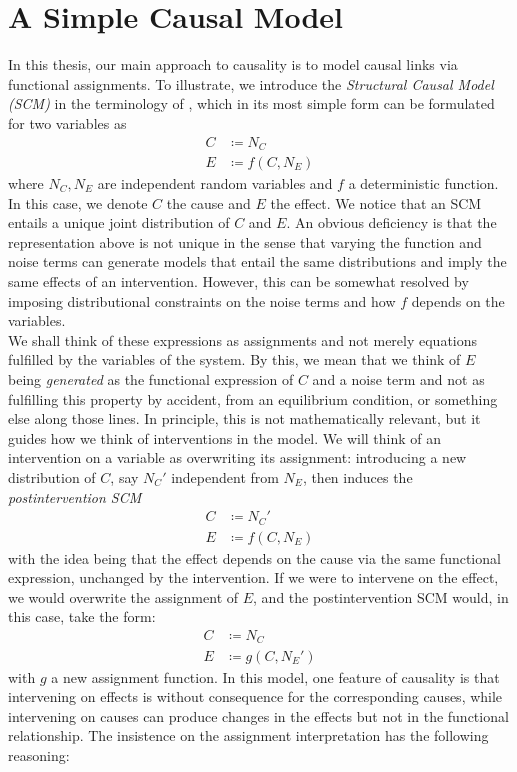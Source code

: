\documentclass[11pt, a4paper]{memoir}
\theoremstyle{break}
\theoremstyle{break}
\theoremstyle{nonumberplain}
\begin{document}
\section{A Simple Causal Model}
In this thesis, our main approach to causality is to model causal links via functional assignments. To illustrate, we introduce the \textit{Structural Causal Model (SCM)} in the terminology of \cite{Peters}, which in its most simple form can be formulated for two variables as
\begin{align*}
C&\coloneqq N_C\\
E&\coloneqq f(C,N_E)
\end{align*}
where $N_C,N_E$ are independent random variables and $f$ a deterministic function. In this case, we denote $C$ the cause and $E$ the effect. We notice that an SCM entails a unique joint distribution of $C$ and $E$. An obvious deficiency is that the representation above is not unique in the sense that varying the function and noise terms can generate models that entail the same distributions and imply the same effects of an intervention. However, this can be somewhat resolved by imposing distributional constraints on the noise terms and how $f$ depends on the variables.\\[5pt]
We shall think of these expressions as assignments and not merely equations fulfilled by the variables of the system. By this, we mean that we think of $E$ being \textit{generated} as the functional expression of $C$ and a noise term and not as fulfilling this property by accident, from an equilibrium condition, or something else along those lines. In principle, this is not mathematically relevant, but it guides how we think of interventions in the model. We will think of an intervention on a variable as overwriting its assignment: introducing a new distribution of $C$, say $N_C'$ independent from $N_E$, then induces the \emph{postintervention SCM}
\begin{align*}
C&\coloneqq N_C'\\
E&\coloneqq f(C,N_E)
\end{align*}
with the idea being that the effect depends on the cause via the same functional expression, unchanged by the intervention. If we were to intervene on the effect, we would overwrite the assignment of $E$, and the postintervention SCM would, in this case, take the form:
\begin{align*}
C&\coloneqq N_C\\
E&\coloneqq g(C,N_E')
\end{align*} 
with $g$ a new assignment function. In this model, one feature of causality is that intervening on effects is without consequence for the corresponding causes, while intervening on causes can produce changes in the effects but not in the functional relationship. The insistence on the assignment interpretation has the following reasoning:
\end{document}
